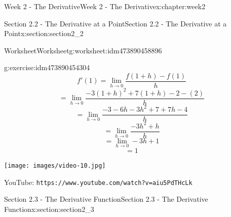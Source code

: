 \documentclass[oneside,10pt,]{book}
\newcommand{\mono}[1]{\texttt{#1}}
\numberwithin{equation}{section}
\newlength{\qrsize}
\newlength{\previewwidth}
\begin{document}
\begin{chapterptx}{Week 2 - The Derivative}{}{Week 2 - The Derivative}{}{}{x:chapter:week2}
\begin{sectionptx}{Section 2.2 - The Derivative at a Point}{}{Section 2.2 - The Derivative at a Point}{}{}{x:section:section2_2}
\begin{worksheet-subsection}{Worksheet}{}{Worksheet}{}{}{g:worksheet:idm473890458896}
\begin{divisionexercise}{3}{}{}{g:exercise:idm473890454304}
\begin{equation*}
f'(1) = \lim_{h\to 0} \frac{f(1+h)-f(1)}{h} 
\end{equation*}
%
\begin{equation*}
= \lim_{h\to 0} \frac{-3(1+h)^2+7(1+h)-2-(2)}{h}
\end{equation*}
%
\begin{equation*}
= \lim_{h\to 0} \frac{-3-6h-3h^2+7+7h-4}{h}
\end{equation*}
%
\begin{equation*}
= \lim_{h\to 0} \frac{-3h^2+h}{h} 
\end{equation*}
%
\begin{equation*}
= \lim_{h\to 0} -3h+1
\end{equation*}
%
\begin{equation*}
= 1 
\end{equation*}
\end{divisionexercise}%
\end{worksheet-subsection}
\restoregeometry
\setlength{\qrsize}{9em}
\setlength{\previewwidth}{\linewidth}
\addtolength{\previewwidth}{-\qrsize}
\begin{tcbraster}[raster columns=2, raster column skip=1pt, raster halign=center, raster force size=false, raster left skip=0pt, raster right skip=0pt]%
\begin{tcolorbox}[previewstyle, width=\previewwidth]%
\texttt{[image: images/video-10.jpg]}%
\end{tcolorbox}%
\begin{tcolorbox}[qrstyle]%
{\hypersetup{urlcolor=black}}%
\end{tcolorbox}%
\begin{tcolorbox}[captionstyle]%
\small YouTube: \mono{https://www.youtube.com/watch?v=aiu5PdTHcLk}\end{tcolorbox}%
\end{tcbraster}%
\end{sectionptx}
%
%
\typeout{************************************************}
\typeout{************************************************}
%
\begin{sectionptx}{Section 2.3 - The Derivative Function}{}{Section 2.3 - The Derivative Function}{}{}{x:section:section2_3}
\setlength{\qrsize}{9em}
\setlength{\previewwidth}{\linewidth}
\addtolength{\previewwidth}{-\qrsize}
\begin{tcbraster}[raster columns=2, raster column skip=1pt, raster halign=center, raster force size=false, raster left skip=0pt, raster right skip=0pt]%

\end{tcbraster}
\end{sectionptx}
\end{chapterptx}
\end{document}
